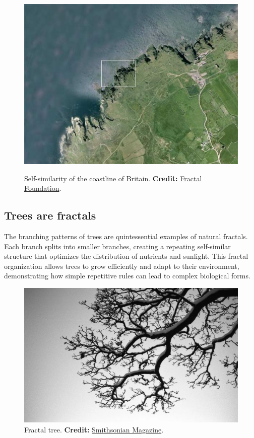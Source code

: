 \documentclass[12pt]{article}
\begin{document}
\begin{figure}[H]
    \begin{minipage}[b]{0.5\textwidth}
        \centering
        \includegraphics[width=\textwidth]{assets/uk4.jpg}
        \label{fig:uk4}
    \end{minipage}
        \caption{Self-similarity of the coastline of Britain. \textbf{Credit:} \href{https://fractalfoundation.org/OFC/OFC-9-4.html}{Fractal Foundation}.}
\end{figure}

\subsection{Trees are fractals}
The branching patterns of trees are quintessential examples of natural fractals. Each branch splits into smaller branches, creating a repeating self-similar structure that optimizes the distribution of nutrients and sunlight. This fractal organization allows trees to grow efficiently and adapt to their environment, demonstrating how simple repetitive rules can lead to complex biological forms.

\begin{figure}[H]
\centering
\includegraphics[width=\textwidth]{assets/fractal-tree.jpg}
\caption{Fractal tree. \textbf{Credit:} \href{https://www.smithsonianmag.com/innovation/fractal-patterns-nature-and-art-are-aesthetically-pleasing-and-stress-reducing-180962738/}{Smithsonian Magazine}.}
\label{fig:fractal-tree}
\end{figure}
\end{document}
